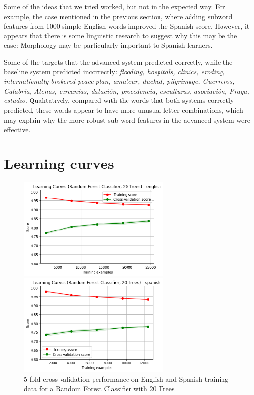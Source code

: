 \documentclass[11pt,a4paper]{article}
\begin{document}
Some of the ideas that we tried worked, but not in the expected way. For example, the case mentioned in the previous section, where adding subword features from 1000 simple English words improved the Spanish score. However, it appears that there is some linguistic research to suggest why this may be the case: Morphology may be particularly important to Spanish learners.

Some of the targets that the advanced system predicted correctly, while the baseline system predicted incorrectly: \emph{flooding, hospitals, clinics, eroding, internationally brokered peace plan, amateur, ducked, pilgrimage, Guerreros, Calabria, Atenas, cercanías, datación, procedencia, esculturas, asociación, Praga, estudio}. Qualitatively, compared with the words that both systems correctly predicted, these words appear to have more unusual letter combinations, which may explain why the more robust sub-word features in the advanced system were effective.

\section{Learning curves}

\begin{figure}[h]
\begin{minipage}[b]{1.0\linewidth}
  \centering
  \centerline{\includegraphics[width=7.5cm]{images/RFCEng}}
\end{minipage}
\begin{minipage}[b]{1.0\linewidth}
  \centering
  \centerline{\includegraphics[width=7.5cm]{images/RFCSp}}
\end{minipage}
\caption{5-fold cross validation performance on English and Spanish training data for a Random Forest Classifier with 20 Trees}
\label{fig:RFC}
\end{figure}
\end{document}
